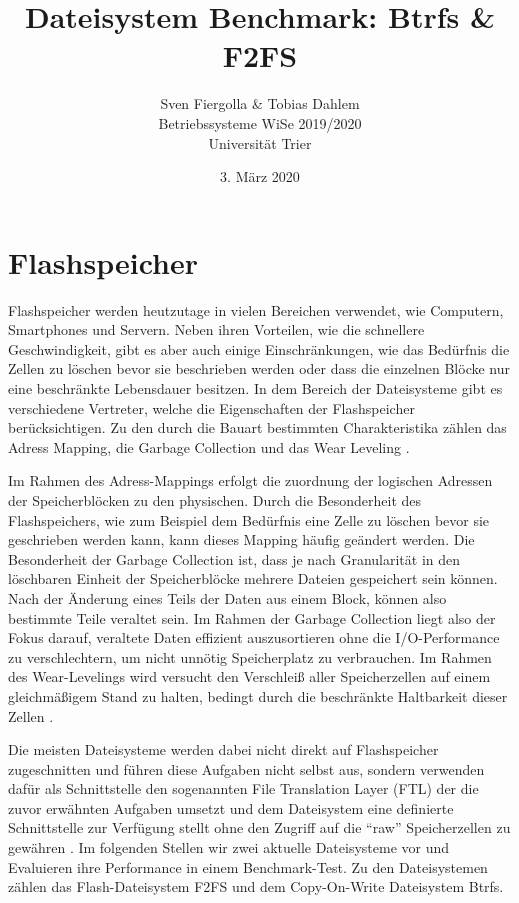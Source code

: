 \documentclass[11pt]{article}
\title{Dateisystem Benchmark: Btrfs \& F2FS}
\author{Sven Fiergolla \& Tobias Dahlem\\
Betriebssysteme WiSe 2019/2020\\
Universität Trier}
\date{3. März 2020}
\begin{document}
\maketitle

\section{Flashspeicher}
\label{flash}
Flashspeicher werden heutzutage in vielen Bereichen verwendet, wie Computern, Smartphones und Servern. Neben ihren Vorteilen, wie die schnellere Geschwindigkeit, gibt es aber auch einige Einschränkungen, wie das Bedürfnis die Zellen zu löschen bevor sie beschrieben werden oder dass die einzelnen Blöcke nur eine beschränkte Lebensdauer besitzen. In dem Bereich der Dateisysteme gibt es verschiedene Vertreter, welche die Eigenschaften der Flashspeicher berücksichtigen. Zu den durch die Bauart bestimmten Charakteristika zählen das Adress Mapping, die Garbage Collection und das Wear Leveling \cite{lee2015f2fs}.

Im Rahmen des Adress-Mappings erfolgt die zuordnung der logischen Adressen der Speicherblöcken zu den physischen. Durch die Besonderheit des Flashspeichers, wie zum Beispiel dem Bedürfnis eine Zelle zu löschen bevor sie geschrieben werden kann, kann dieses Mapping häufig geändert werden.
Die Besonderheit der Garbage Collection ist, dass je nach Granularität in den löschbaren Einheit der Speicherblöcke mehrere Dateien gespeichert sein können. Nach der Änderung eines Teils der Daten aus einem Block, können also bestimmte Teile veraltet sein. Im Rahmen der Garbage Collection liegt also der Fokus darauf, veraltete Daten effizient auszusortieren ohne die I/O-Performance zu verschlechtern, um nicht unnötig Speicherplatz zu verbrauchen.
Im Rahmen des Wear-Levelings wird versucht den Verschleiß aller Speicherzellen auf einem gleichmäßigem Stand zu halten, bedingt durch die beschränkte Haltbarkeit dieser Zellen \cite{CHUNG2009332}.

Die meisten Dateisysteme werden dabei nicht direkt auf Flashspeicher zugeschnitten und führen diese Aufgaben nicht selbst aus, sondern verwenden dafür als Schnittstelle den sogenannten File Translation Layer (FTL) der die zuvor erwähnten Aufgaben umsetzt und dem Dateisystem eine definierte Schnittstelle zur Verfügung stellt ohne den Zugriff auf die \enquote{raw} Speicherzellen zu gewähren \cite{lee2015f2fs}.
Im folgenden Stellen wir zwei aktuelle Dateisysteme vor und Evaluieren ihre Performance in einem Benchmark-Test. Zu den Dateisystemen zählen das Flash-Dateisystem F2FS und dem Copy-On-Write Dateisystem Btrfs.
\end{document}
